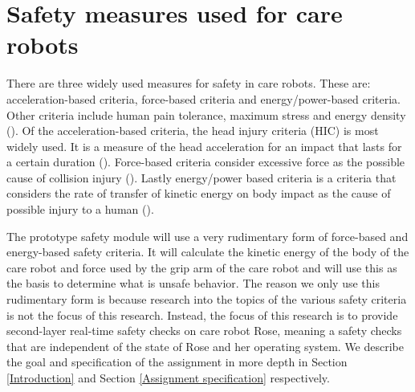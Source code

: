 \documentclass[12pt]{scrreprt}
\begin{document}
 \section{Safety measures used for care robots}
 \label{Safety in care robots}
There are three widely used measures for safety in care robots. These are: acceleration-based criteria,  force-based criteria and energy/power-based criteria. Other criteria include human pain tolerance, maximum stress and energy density (\cite{tadele}). Of the acceleration-based criteria, the head injury criteria (HIC) is most widely used. It is a measure of the head acceleration for an impact that lasts for a certain duration (\cite{hic}). Force-based criteria consider excessive force as the possible cause of collision injury (\cite{force}). Lastly energy/power based criteria is a criteria that considers the rate of transfer of kinetic energy on body impact as the cause of possible injury to a human (\cite{crucial_milestone}).
\par
The prototype safety module will use a very rudimentary form of force-based and energy-based safety criteria. It will calculate the kinetic energy of the body of the care robot and force used by the grip arm of the care robot and will use this as the basis to determine what is unsafe behavior. The reason we only use this rudimentary form is because research into the topics of the various safety criteria is not the focus of this research. Instead, the focus of this research is to provide second-layer real-time safety checks on care robot Rose, meaning a safety checks that are independent of the state of Rose and her operating system. We describe the goal and specification of the assignment in more depth in Section \ref{Introduction} and Section \ref{Assignment specification} respectively.
 
\end{document}
